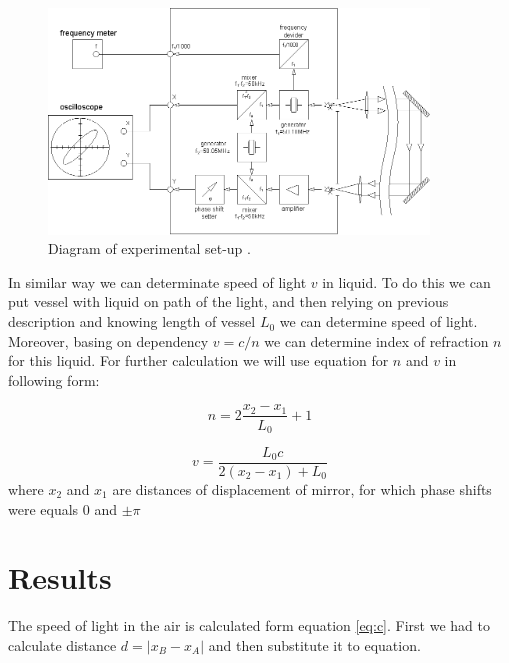 \documentclass[a4paper,12pt]{article}
\begin{document}
    \begin{figure}[H]
    \begin{center}
        \includegraphics[width=0.9\textwidth]{set-up}
        \caption{Diagram of experimental set-up \cite{E418}.}
        \label{fig:set-up}
    \end{center}
    \end{figure}

    In similar way we can determinate speed of light $v$ in liquid. To do this we can put vessel with liquid on path of the light, and then relying on previous description and knowing length of vessel $L_0$ we can determine speed of light. Moreover, basing on dependency $v = c/n$ \cite{HRW} we can determine index of refraction $n$ for this liquid. For further calculation we will use equation for $n$ and $v$ in following form:

    \begin{equation}
        n = 2 \frac{x_2-x_1}{L_0} + 1 \label{eq:n}
    \end{equation}
    
    \begin{equation}
        v = \frac{L_0 c}{2(x_2 - x_1) + L_0} \label{eq:v}
    \end{equation}
    where $x_2$ and $x_1$ are distances of displacement of mirror, for which phase shifts were equals 0 and $\pm \pi$ 

    \section{Results}
    
    The speed of light in the air is calculated form equation \ref{eq:c}. First we had to calculate distance $ d = |x_B - x_A|$ and then substitute it to equation. 
\end{document}
